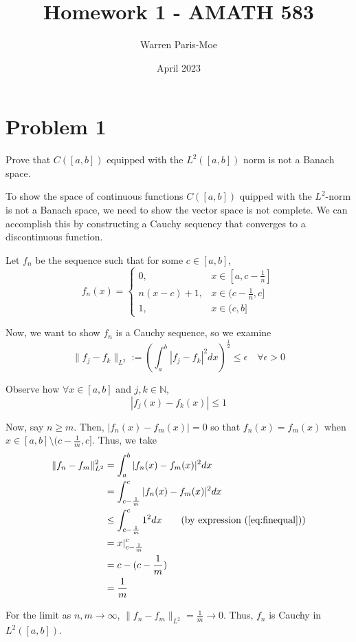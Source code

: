 \documentclass[12pt]{article}
\title{Homework 1 - AMATH 583}
\author{Warren Paris-Moe}
\date{April 2023}
\begin{document}
\section{Problem 1}
\begin{mdframed}
    Prove that $C([a,b])$ equipped with the $L^2([a,b])$ norm is not a Banach space.
\end{mdframed}

To show the space of continuous functions $C([a,b])$ quipped with the $L^2$-norm is not a Banach space, we need to show the vector space is not complete. We can accomplish this by constructing a Cauchy sequency that converges to a discontinuous function.

Let $f_n$ be the sequence such that for some $c\in[a,b]$,
\[
    f_n(x) = 
        \begin{cases}
            0, & x \in [a, c - \frac{1}{n}] \\
            n(x - c) + 1, & x \in (c - \frac{1}{n}, c] \\
            1, & x \in (c, b]
        \end{cases}
\]

Now, we want to show $f_n$ is a Cauchy sequence, so we examine
\[
    \|f_j - f_k\|_{L^2} := (\int_{a}^{b} |f_j-f_k|^2dx)^{\frac{1}{2}} \leq \epsilon \quad \forall \epsilon > 0
\]

Observe how $\forall x \in [a,b]$ and $j,k \in \mathbb{N}$,
\begin{equation} 
\label{eq:finequal}
    |f_j(x) - f_k(x)| \leq 1
\end{equation}

Now, say $n\geq m$. Then, $|f_n(x) - f_m(x)| = 0$ so that $f_n(x) = f_m(x)$ when $x \in [a,b] \setminus (c-\frac{1}{m}, c]$. Thus, we take
\begin{align*}
    \|f_n - f_m\|_{L^2}^2 &= \int_{a}^{b} |f_n(x) - f_m(x)|^2dx \\
        &= \int_{c-\frac{1}{m}}^{c} |f_n(x) - f_m(x)|^2dx \\
        &\leq \int_{c-\frac{1}{m}}^{c} 1^2dx \tag{by expression (\ref{eq:finequal})}\\
        &= x|_{c-\frac{1}{m}}^{c} \\
        &= c - (c - \frac{1}{m}) \\
        &= \frac{1}{m}
\end{align*} 

For the limit as $n,m \to \infty$, $\|f_n-f_m\|_{L^2}=\frac{1}{m} \to 0$. Thus, $f_n$ is Cauchy in $L^2([a,b])$.
\end{document}
